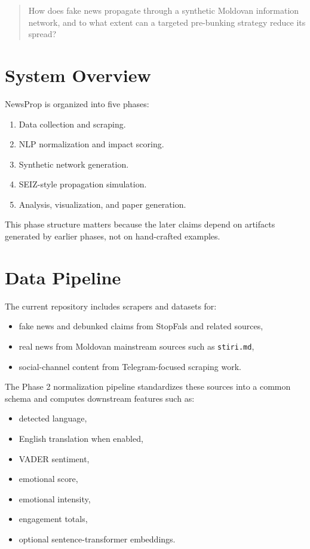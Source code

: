 \documentclass[11pt,a4paper]{article}
\begin{document}
\begin{quote}
How does fake news propagate through a synthetic Moldovan information network, and to what extent can a targeted pre-bunking strategy reduce its spread?
\end{quote}

\section{System Overview}
NewsProp is organized into five phases:

\begin{enumerate}
  \item Data collection and scraping.
  \item NLP normalization and impact scoring.
  \item Synthetic network generation.
  \item SEIZ-style propagation simulation.
  \item Analysis, visualization, and paper generation.
\end{enumerate}

This phase structure matters because the later claims depend on artifacts generated by earlier phases, not on hand-crafted examples.

\section{Data Pipeline}
The current repository includes scrapers and datasets for:

\begin{itemize}
  \item fake news and debunked claims from StopFals and related sources,
  \item real news from Moldovan mainstream sources such as \texttt{stiri.md},
  \item social-channel content from Telegram-focused scraping work.
\end{itemize}

The Phase 2 normalization pipeline standardizes these sources into a common schema and computes downstream features such as:

\begin{itemize}
  \item detected language,
  \item English translation when enabled,
  \item VADER sentiment,
  \item emotional score,
  \item emotional intensity,
  \item engagement totals,
  \item optional sentence-transformer embeddings.
\end{itemize}
\end{document}
